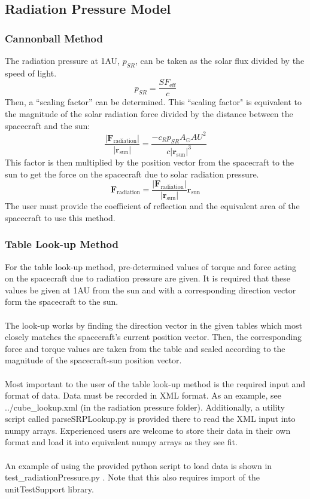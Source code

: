 \documentclass[]{BasiliskReportMemo}
\newcommand{\testname}{test\_radiationPressure.py }
\begin{document}
\subsection{Radiation Pressure Model}
\subsubsection{Cannonball Method}
The radiation pressure at 1AU, $p_{SR}$, can be taken as the solar flux divided by the speed of light. 
\begin{equation}
p_{SR} = \frac{SF_{\mathrm{eff}}}{c}
\end{equation}
Then, a ``scaling factor'' can be determined. This ``scaling factor" is equivalent to the magnitude of the solar radiation force divided by the distance between the spacecraft and the sun:
\begin{equation}
\frac{|\mathbf{F}_{\textrm{radiation}}|}{|\mathbf{r}_{\textrm{sun}}|} = \frac{-c_{R}p_{SR}A_{\odot}{AU}^2}{c |\mathbf{r}_{\textrm{sun}}|^3}
\end{equation}
This factor is then multiplied by the position vector from the spacecraft to the sun to get the force on the spacecraft due to solar radiation pressure.
\begin{equation}
{\mathbf{F}_{\textrm{radiation}}} = \frac{|\mathbf{F}_{\textrm{radiation}}|}{|\mathbf{r}_{\textrm{sun}}|}  \mathbf{r}_{\textrm{sun}}
\end{equation}
The user must provide the coefficient of reflection and the equivalent area of the spacecraft to use this method.\\
\subsubsection{Table Look-up Method}
For the table look-up method, pre-determined values of torque and force acting on the spacecraft due to radiation pressure are given. It is required that these values be given at 1AU from the sun and with a corresponding direction vector form the spacecraft to the sun.\\\\
The look-up works by finding the direction vector in the given tables which most closely matches the spacecraft's current position vector. Then, the corresponding force and torque values are taken from the table and scaled according to the magnitude of the spacecraft-sun position vector.\\\\
Most important to the user of the table look-up method is the required input and format of data. Data must be recorded in XML format. As an example, see ../cube\_lookup.xml (in the radiation pressure folder). Additionally, a utility script called parseSRPLookup.py is provided there to read the XML input into numpy arrays. Experienced users are welcome to store their data in their own format and load it into equivalent numpy arrays as they see fit.\\\\
An example of using the provided python script to load data is shown in \testname. Note that this also requires import of the unitTestSupport library.\\
\end{document}
